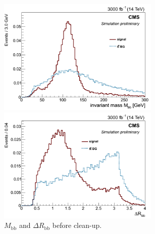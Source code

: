 \documentclass[10pt,a4paper]{article}
\newcommand{\ww}{7.7cm} %
\newcommand{\dd}{-2mm} %
\begin{document}
\begin{figure}[h]
    \begin{minipage}[h!]{\ww}
      \centering
      \includegraphics[width=\ww]{figs/M_bb_closest_stage1.png}
    \end{minipage}
    \begin{minipage}[h!]{\ww}
      \centering
      \includegraphics[width=\ww]{figs/DeltaR_bb1_stage1.png}
    \end{minipage}
  \vspace{\dd}
  \caption{$M_\text{bb}$ and $\Delta R_\text{bb}$ before clean-up.} \label{precleanup}
\end{figure}
\end{document}
